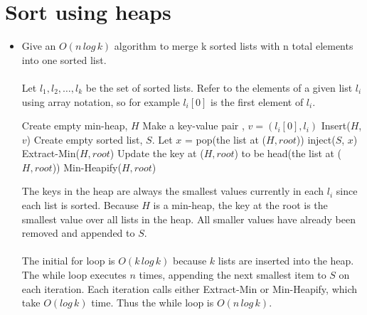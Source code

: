 \documentclass[11pt]{article}
\title{}
\author{}
\date{}                                           %
\begin{document}
\maketitle

\section{Sort using heaps}
\begin{itemize}
\item{
Give an $O(n\,log\,k)$ algorithm to merge k sorted lists with n total elements into one sorted list.
\\
\\
Let ${l_1, l_2, \dots,l_k}$ be the set of sorted lists. Refer to the elements of a given list $l_i$ using array notation, so for example ${l_i}[0]$ is the first element of $l_i$.
\\
\begin{algorithmic}
  \STATE Create empty min-heap, $H$
  \STATE Make a key-value pair , $v = ({l_i}[0], l_i)$
  \STATE Insert($H$,$v$)
  \ENDFOR
  \STATE Create empty sorted list, $S$.
    \STATE Let $x$ = pop(the list at ($H,root$)) 
    \STATE inject($S$, $x$)
      \STATE Extract-Min($H, root$) 
    \ELSE
      \STATE Update the key at ($H,root$) to be head(the list at ($H,root$))
      \STATE Min-Heapify($H,root$)
    \ENDIF
  \ENDWHILE
\end{algorithmic}

The keys in the heap are always the smallest values currently in each $l_i$ since each list is sorted. Because $H$ is a min-heap, the key at the root is the smallest value over all lists in the heap. All smaller values have already been removed and appended to $S$.
\\
\\
The initial for loop is $O(k\,log\,k)$ because $k$ lists are inserted into the heap. The while loop executes $n$ times, appending the next smallest item to $S$ on each iteration. Each iteration calls either Extract-Min or Min-Heapify, which take $O(log\,k)$ time. Thus the while loop is $O(n\,log\,k)$.
}


\end{itemize}
\end{document}
